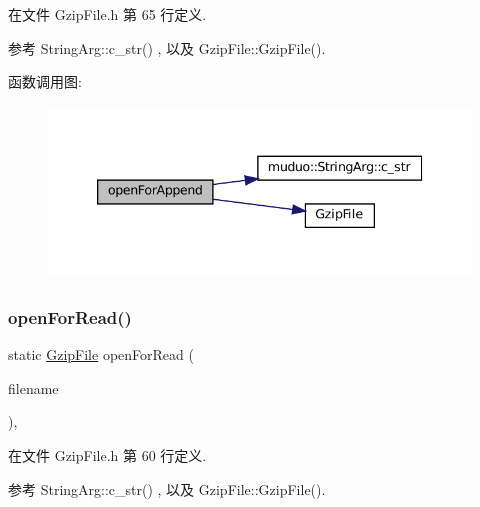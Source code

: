 在文件 Gzip\+File.\+h 第 65 行定义.



参考 String\+Arg\+::c\+\_\+str() , 以及 Gzip\+File\+::\+Gzip\+File().

函数调用图\+:
\nopagebreak
\begin{figure}[H]
\begin{center}
\leavevmode
\includegraphics[width=339pt]{classmuduo_1_1GzipFile_a9c729746e69ca041b116552594ddb70a_cgraph}
\end{center}
\end{figure}
\mbox{\label{classmuduo_1_1GzipFile_a0a3314e3024363b639db1f864586647a}} 
\subsubsection{\texorpdfstring{open\+For\+Read()}{openForRead()}}
{\footnotesize\ttfamily static \hyperlink{classmuduo_1_1GzipFile}{Gzip\+File} open\+For\+Read (\begin{DoxyParamCaption}\item[{\hyperlink{classmuduo_1_1StringArg}{String\+Arg}}]{filename }\end{DoxyParamCaption})\hspace{0.3cm}{\ttfamily [inline]}, {\ttfamily [static]}}



在文件 Gzip\+File.\+h 第 60 行定义.



参考 String\+Arg\+::c\+\_\+str() , 以及 Gzip\+File\+::\+Gzip\+File().

